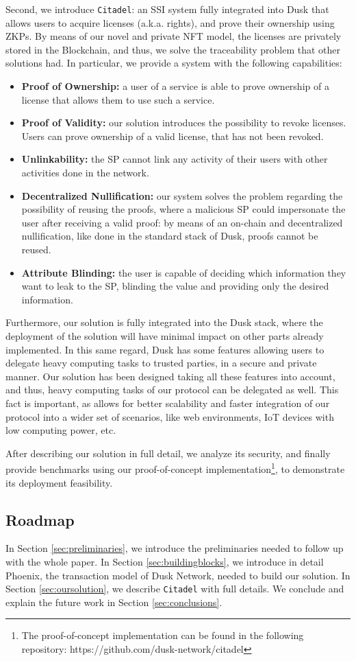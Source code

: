 Second, we introduce \verb!Citadel!: an SSI system fully integrated into Dusk that allows users to acquire licenses (a.k.a. rights), and prove their ownership using ZKPs. By means of our novel and private NFT model, the licenses are privately stored in the Blockchain, and thus, we solve the traceability problem that other solutions had. In particular, we provide a system with the following capabilities:

\begin{itemize}
	\item \textbf{Proof of Ownership:} a user of a service is able to prove ownership of a license that allows them to use such a service.
	\item \textbf{Proof of Validity:} our solution introduces the possibility to revoke licenses. Users can prove ownership of a valid license, that has not been revoked.
 	\item \textbf{Unlinkability:} the SP cannot link any activity of their users with other activities done in the network.
 	\item \textbf{Decentralized Nullification:} our system solves the problem regarding the possibility of reusing the proofs, where a malicious SP could impersonate the user after receiving a valid proof: by means of an on-chain and decentralized nullification, like done in the standard stack of Dusk, proofs cannot be reused.
	\item \textbf{Attribute Blinding:} the user is capable of deciding which information they want to leak to the SP, blinding the value and providing only the desired information.
\end{itemize}

Furthermore, our solution is fully integrated into the Dusk stack, where the deployment of the solution will have minimal impact on other parts already implemented. In this same regard, Dusk has some features allowing users to delegate heavy computing tasks to trusted parties, in a secure and private manner. Our solution has been designed taking all these features into account, and thus, heavy computing tasks of our protocol can be delegated as well. This fact is important, as allows for better scalability and faster integration of our protocol into a wider set of scenarios, like web environments, IoT devices with low computing power, etc.

After describing our solution in full detail, we analyze its security, and finally provide benchmarks using our proof-of-concept implementation\footnote{The proof-of-concept implementation can be found in the following repository: https://github.com/dusk-network/citadel}, to demonstrate its deployment feasibility.

\subsection{Roadmap} 

In Section \ref{sec:preliminaries}, we introduce the preliminaries needed to follow up with the whole paper. In Section \ref{sec:buildingblocks}, we introduce in detail Phoenix, the transaction model of Dusk Network, needed to build our solution. In Section \ref{sec:oursolution}, we describe \verb!Citadel! with full details. We conclude and explain the future work in Section \ref{sec:conclusions}.
